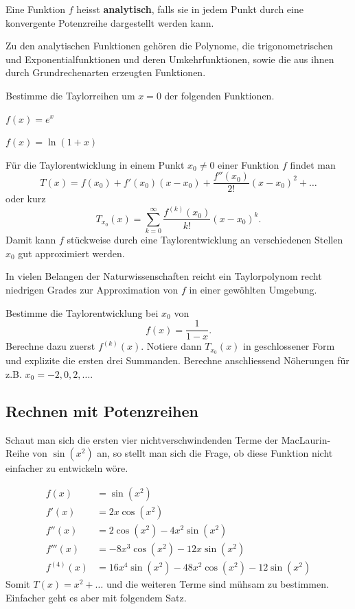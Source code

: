 \documentclass[%
draft,
11pt,%
twoside,%
titlepage,%
german,%
headsepline%
]{scrartcl}
\begin{document}
\begin{defn}
Eine Funktion $f$ heisst \textbf{analytisch}, falls sie in jedem Punkt durch eine konvergente Potenzreihe dargestellt werden kann.
\end{defn}
Zu den analytischen Funktionen geh\"oren die Polynome, die trigonometrischen und Exponentialfunktionen und deren Umkehrfunktionen, sowie die aus ihnen durch Grundrechenarten erzeugten Funktionen.
\begin{ueb}
Bestimme die Taylorreihen um $x=0$ der folgenden Funktionen.
\begin{enumeratea}
\item $f(x)=e^x$
\item $f(x)=\ln(1+x)$
\end{enumeratea}
\end{ueb}
F\"ur die Taylorentwicklung in einem Punkt $x_0\neq0$ einer Funktion $f$ findet man
$$T(x)=f(x_0)+f'(x_0)(x-x_0)+\frac{f''(x_0)}{2!}(x-x_0)^2+\dots$$
oder kurz
$$T_{x_0}(x)=\sum_{k=0}^\infty \frac{f^{(k)}(x_0)}{k!}(x-x_0)^k.$$
Damit kann $f$ st\"uckweise durch eine Taylorentwicklung an verschiedenen Stellen $x_0$ gut approximiert werden.
\begin{bem}
In vielen Belangen der Naturwissenschaften reicht ein Taylorpolynom recht niedrigen Grades zur Approximation von $f$ in einer gew\"ohlten Umgebung.
\end{bem} 

\begin{ueb}
Bestimme die Taylorentwicklung bei $x_0$ von
$$f(x)=\frac{1}{1-x}.$$
Berechne dazu zuerst $f^{(k)}(x)$. Notiere dann $T_{x_0}(x)$ in geschlossener Form und explizite die ersten drei Summanden. Berechne anschliessend N\"oherungen f\"ur z.B. $x_0=-2,0,2,\dots$.
\end{ueb}

\subsection{Rechnen mit Potenzreihen}

Schaut man sich die ersten vier nichtverschwindenden Terme der MacLaurin-Reihe von $\sin(x^2)$ an, so stellt man sich die Frage, ob diese Funktion nicht einfacher zu entwickeln w\"ore.

\begin{align*}
f(x) &= \sin(x^2) \\
f'(x) &= 2x\cos(x^2) \\
f''(x) &= 2\cos(x^2)-4x^2\sin(x^2) \\
f'''(x) &= -8x^3\cos(x^2)-12x\sin(x^2) \\
f^{(4)}(x) &= 16x^4\sin(x^2)-48x^2\cos(x^2)-12\sin(x^2)
\end{align*}
Somit $T(x)=x^2+\dots$ und die weiteren Terme sind m\"uhsam zu bestimmen. Einfacher geht es aber mit folgendem Satz.
\end{document}
